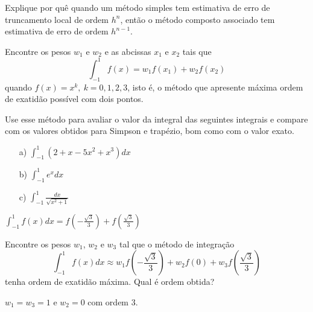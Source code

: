 \begin{exer} Explique por quê quando um método simples tem estimativa de erro de truncamento local de ordem $h^n$, então o método composto associado tem estimativa de erro de ordem $h^{n-1}$.
\end{exer}

\begin{exer} Encontre os pesos $w_1$ e $w_2$ e as abcissas $x_1$ e $x_2$ tais que
$$\int_{-1}^1f(x)=w_1f(x_1)+w_2f(x_2)$$
quando $f(x)=x^k, ~k=0,1,2,3$, isto é, o método que apresente máxima ordem de exatidão possível com dois pontos.

Use esse método para avaliar o valor da integral das seguintes integrais e compare com os valores obtidos para Simpson e trapézio, bom como com o valor exato.
\begin{itemize}
\item[a)] $\int_{-1}^1\left(2+x-5x^2+x^3\right)dx$
\item[b)] $\int_{-1}^1e^{x}dx$
\item[c)] $\int_{-1}^1\frac{dx}{\sqrt{x^2+1}}$
\end{itemize}
\end{exer}
\begin{resp}
  
$\int_{-1}^1f(x)dx=f\left(-\frac{\sqrt{3}}{3}\right)+f\left(\frac{\sqrt{3}}{3}\right)$    
  
\end{resp}


\begin{exer} Encontre os pesos $w_1$, $w_2$ e $w_3$ tal que o método de integração
$$\int_{-1}^1 f(x)dx \approx w_1 f\left(-\frac{\sqrt{3}}{3}\right)  + w_2f(0) + w_3f\left(\frac{\sqrt{3}}{3}\right)$$
tenha ordem de exatidão máxima. Qual é ordem obtida?
\end{exer}
\begin{resp}
  
$w_1=w_3=1$ e $w_2=0$ com ordem 3.    
  
\end{resp}


% 

